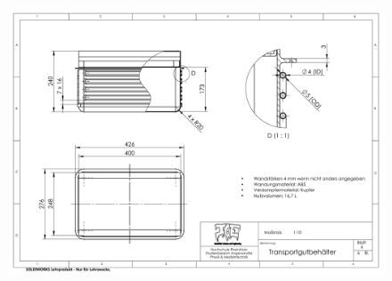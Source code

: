	\clearpage
	\begin{figure}[h]
		\centering
		\includegraphics[angle=90, height=\textheight]{Assembly/nutzvolumen_zeichnung.PDF}
		\label{fig:nutzvolumen zeichnung}
	\end{figure}